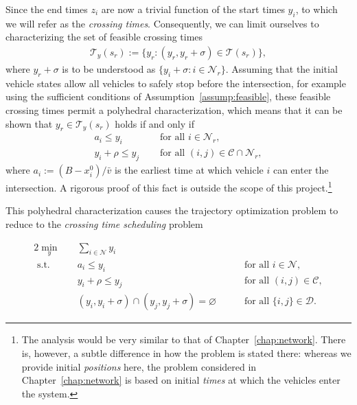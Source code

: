 \documentclass[a4paper]{report}
\theoremstyle{definition}
\theoremstyle{plain}
\begin{document}
Since the end times $z_{i}$ are now a trivial function of the start times $y_i$,
to which we will refer as the \emph{crossing times}.
%
Consequently, we can limit ourselves to characterizing the set of feasible
crossing times
\begin{align}
  \label{eq:1}
  \mathcal{T}_{y}(s_{r}) := \{ y_{r} : (y_{r}, y_{r} + \sigma) \in \mathcal{T}(s_{r}) \} ,
\end{align}
where $y_{r} + \sigma$ is to be understood as $\{y_{i} + \sigma : i \in \mathcal{N}_{r}\}$.
%
Assuming that the initial vehicle states allow all vehicles to safely stop
before the intersection, for example using the sufficient conditions of
Assumption~\ref{assump:feasible}, these feasible crossing times permit a
polyhedral characterization, which means that it can be shown that
$y_{r} \in \mathcal{T}_{y}(s_{r})$ holds if and only if
\begin{subequations}
\begin{align}
  a_{i} \leq y_i & \quad \text{ for all } i \in \mathcal{N}_{r} , \\
  y_i + \rho \leq y_j & \quad \text{ for all } (i,j) \in \mathcal{C} \cap \mathcal{N}_{r} ,
\end{align}
\end{subequations}
where $a_{i} := (B - x_{i}^{0}) / \bar{v}$ is the earliest time at which vehicle
$i$ can enter the intersection.
%
A rigorous proof of this fact is outside the scope of this project.\footnote{The analysis would be very similar to that of Chapter~\ref{chap:network}. There is, however, a subtle difference in how the problem is stated there: whereas we provide initial \emph{positions} here, the problem considered in Chapter~\ref{chap:network} is based on initial \emph{times} at which the vehicles enter the system.}

%
This polyhedral characterization causes the trajectory optimization problem to
reduce to the \textit{crossing time scheduling} problem
\begin{mdframed}
\vspace{-\abovedisplayskip}
\begin{alignat}{2}\label{eq:C}
  \min_{y} \quad & \sum_{i \in \mathcal{N}} y_i \tag{C} \\
  \text{ s.t. } \quad & a_{i} \leq y_i  && \quad \text{ for all } i \in \mathcal{N} , \tag{C.1} \\
                    & y_i + \rho \leq y_{j}  && \quad \text{ for all } (i,j) \in \mathcal{C} \label{eq:conjunctive} , \tag{C.2} \\
                    & (y_{i}, y_i + \sigma) \cap (y_{j}, y_j + \sigma) = \varnothing && \quad \text{ for all } \{i,j\} \in \mathcal{D} \label{eq:disjunctive} \tag{C.3}.
\end{alignat}
\end{mdframed}
\end{document}

